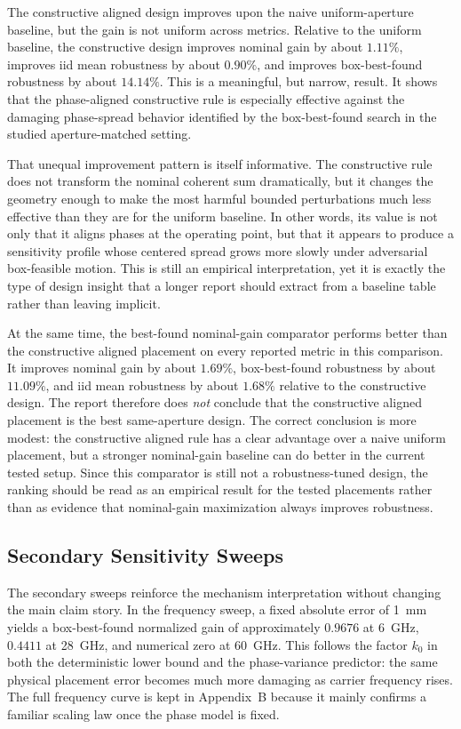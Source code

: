 The constructive aligned design improves upon the naive uniform-aperture baseline, but the gain is not uniform across metrics. Relative to the uniform baseline, the constructive design improves nominal gain by about $1.11\%$, improves iid mean robustness by about $0.90\%$, and improves box-best-found robustness by about $14.14\%$. This is a meaningful, but narrow, result. It shows that the phase-aligned constructive rule is especially effective against the damaging phase-spread behavior identified by the box-best-found search in the studied aperture-matched setting.

That unequal improvement pattern is itself informative. The constructive rule does not transform the nominal coherent sum dramatically, but it changes the geometry enough to make the most harmful bounded perturbations much less effective than they are for the uniform baseline. In other words, its value is not only that it aligns phases at the operating point, but that it appears to produce a sensitivity profile whose centered spread grows more slowly under adversarial box-feasible motion. This is still an empirical interpretation, yet it is exactly the type of design insight that a longer report should extract from a baseline table rather than leaving implicit.

At the same time, the best-found nominal-gain comparator performs better than the constructive aligned placement on every reported metric in this comparison. It improves nominal gain by about $1.69\%$, box-best-found robustness by about $11.09\%$, and iid mean robustness by about $1.68\%$ relative to the constructive design. The report therefore does \emph{not} conclude that the constructive aligned placement is the best same-aperture design. The correct conclusion is more modest: the constructive aligned rule has a clear advantage over a naive uniform placement, but a stronger nominal-gain baseline can do better in the current tested setup. Since this comparator is still not a robustness-tuned design, the ranking should be read as an empirical result for the tested placements rather than as evidence that nominal-gain maximization always improves robustness.

\subsection{Secondary Sensitivity Sweeps}

The secondary sweeps reinforce the mechanism interpretation without changing the main claim story. In the frequency sweep, a fixed absolute error of \SI{1}{mm} yields a box-best-found normalized gain of approximately $0.9676$ at \SI{6}{GHz}, $0.4411$ at \SI{28}{GHz}, and numerical zero at \SI{60}{GHz}. This follows the factor $k_0$ in both the deterministic lower bound and the phase-variance predictor: the same physical placement error becomes much more damaging as carrier frequency rises. The full frequency curve is kept in Appendix~B because it mainly confirms a familiar scaling law once the phase model is fixed.

